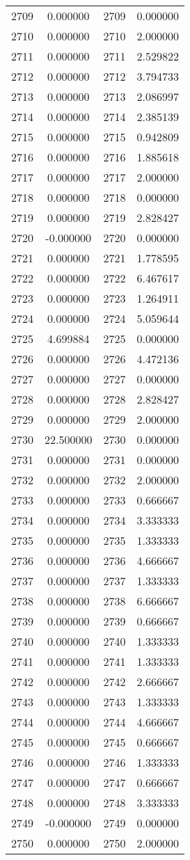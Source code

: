 \documentclass[12pt]{article}
\begin{document}
\begin{longtable}{@{}cccc@{}}
2709 & 0.000000 & 2709 & 0.000000 \\
2710 & 0.000000 & 2710 & 2.000000 \\
2711 & 0.000000 & 2711 & 2.529822 \\
2712 & 0.000000 & 2712 & 3.794733 \\
2713 & 0.000000 & 2713 & 2.086997 \\
2714 & 0.000000 & 2714 & 2.385139 \\
2715 & 0.000000 & 2715 & 0.942809 \\
2716 & 0.000000 & 2716 & 1.885618 \\
2717 & 0.000000 & 2717 & 2.000000 \\
2718 & 0.000000 & 2718 & 0.000000 \\
2719 & 0.000000 & 2719 & 2.828427 \\
2720 & -0.000000 & 2720 & 0.000000 \\
2721 & 0.000000 & 2721 & 1.778595 \\
2722 & 0.000000 & 2722 & 6.467617 \\
2723 & 0.000000 & 2723 & 1.264911 \\
2724 & 0.000000 & 2724 & 5.059644 \\
2725 & 4.699884 & 2725 & 0.000000 \\
2726 & 0.000000 & 2726 & 4.472136 \\
2727 & 0.000000 & 2727 & 0.000000 \\
2728 & 0.000000 & 2728 & 2.828427 \\
2729 & 0.000000 & 2729 & 2.000000 \\
2730 & 22.500000 & 2730 & 0.000000 \\
2731 & 0.000000 & 2731 & 0.000000 \\
2732 & 0.000000 & 2732 & 2.000000 \\
2733 & 0.000000 & 2733 & 0.666667 \\
2734 & 0.000000 & 2734 & 3.333333 \\
2735 & 0.000000 & 2735 & 1.333333 \\
2736 & 0.000000 & 2736 & 4.666667 \\
2737 & 0.000000 & 2737 & 1.333333 \\
2738 & 0.000000 & 2738 & 6.666667 \\
2739 & 0.000000 & 2739 & 0.666667 \\
2740 & 0.000000 & 2740 & 1.333333 \\
2741 & 0.000000 & 2741 & 1.333333 \\
2742 & 0.000000 & 2742 & 2.666667 \\
2743 & 0.000000 & 2743 & 1.333333 \\
2744 & 0.000000 & 2744 & 4.666667 \\
2745 & 0.000000 & 2745 & 0.666667 \\
2746 & 0.000000 & 2746 & 1.333333 \\
2747 & 0.000000 & 2747 & 0.666667 \\
2748 & 0.000000 & 2748 & 3.333333 \\
2749 & -0.000000 & 2749 & 0.000000 \\
2750 & 0.000000 & 2750 & 2.000000 \\


\end{longtable}
\end{document}
